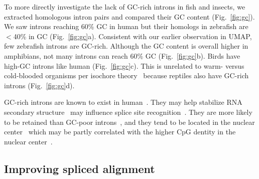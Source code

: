 \documentclass[webpdf,contemporary,large,namedate]{oup-authoring-template}%
\begin{document}
To more directly investigate the lack of GC-rich introns in fish and insects,
we extracted homologous intron pairs and compared their GC content (Fig.~\ref{fig:gc}).
We saw introns reaching 60\% GC in human but their homologs in zebrafish are $<$40\% in GC (Fig.~\ref{fig:gc}a).
Consistent with our earlier observation in UMAP, few zebrafish introns are GC-rich.
Although the GC content is overall higher in amphibians, not many introns can reach 60\% GC (Fig.~\ref{fig:gc}b).
Birds have high-GC introns like human (Fig.~\ref{fig:gc}c).
This is unrelated to warm- versus cold-blooded organisms per isochore theory~\citep{Bernardi:1985aa}
because reptiles also have GC-rich introns (Fig.~\ref{fig:gc}d).


GC-rich introns are known to exist in human~\citep{Wang:2011aa}.
They may help stabilize RNA secondary structure~\citep{Zhang:2011aa}
may influence splice site recognition~\citep{Amit:2012aa}.
They are more likely to be retained than GC-poor introns~\citep{Sibley:2016vh},
and they tend to be located in the nuclear center~\citep{Choquet:2025aa}
which may be partly correlated with the higher CpG dentity in the nuclear center~\citep{Xie:2017aa,Tan:2018aa}.

\subsection{Improving spliced alignment}
\end{document}
